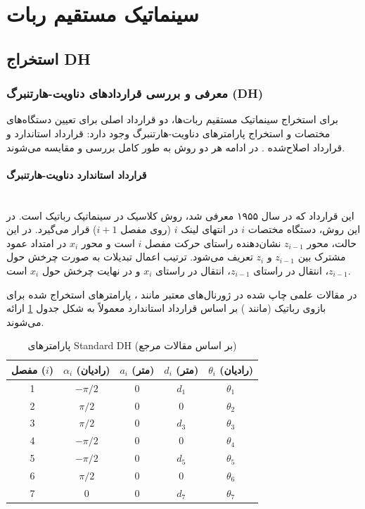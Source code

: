 \documentclass{article}
\begin{document}


\tableofcontents \clearpage
\listoffigures \clearpage
\listoftables \clearpage
\lstlistoflistings \clearpage
\newpage

\section{سینماتیک مستقیم ربات }

\subsection{استخراج DH}

\subsubsection{معرفی و بررسی قراردادهای دناویت-هارتنبرگ (DH)}

برای استخراج سینماتیک مستقیم ربات‌ها، دو قرارداد اصلی برای تعیین دستگاه‌های مختصات و استخراج پارامترهای دناویت-هارتنبرگ وجود دارد: قرارداد استاندارد  و قرارداد اصلاح‌شده . در ادامه هر دو روش به طور کامل بررسی و مقایسه می‌شوند.

\paragraph{قرارداد استاندارد دناویت-هارتنبرگ }\mbox{}\\
این قرارداد که در سال ۱۹۵۵ معرفی شد، روش کلاسیک در سینماتیک رباتیک است. در این روش، دستگاه مختصات $i$ در انتهای لینک $i$ (روی مفصل $i+1$) قرار می‌گیرد. در این حالت، محور $z_{i-1}$ نشان‌دهنده راستای حرکت مفصل $i$ است و محور $x_i$ در امتداد عمود مشترک بین $z_{i-1}$ و $z_i$ تعریف می‌شود. ترتیب اعمال تبدیلات به صورت چرخش حول $z_{i-1}$، انتقال در راستای $z_{i-1}$، انتقال در راستای $x_i$ و در نهایت چرخش حول $x_i$ است. 

در مقالات علمی چاپ شده در ژورنال‌های معتبر مانند  ، پارامترهای استخراج شده برای بازوی رباتیک (مانند ) بر اساس قرارداد استاندارد معمولاً به شکل جدول \ref{tab:standard_dh} ارائه می‌شوند.

\begin{table}[htbp]
	\centering
	\caption{پارامترهای Standard DH (بر اساس مقالات مرجع)}
	\label{tab:standard_dh}
	\begin{tabular}{|c|c|c|c|c|}
		\hline
		مفصل ($i$) & $\alpha_i$ (رادیان) & $a_i$ (متر) & $d_i$ (متر) & $\theta_i$ (رادیان) \\ \hline
		1 & $-\pi/2$ & 0 & $d_1$ & $\theta_1$ \\ \hline
		2 & $\pi/2$ & 0 & 0 & $\theta_2$ \\ \hline
		3 & $\pi/2$ & 0 & $d_3$ & $\theta_3$ \\ \hline
		4 & $-\pi/2$ & 0 & 0 & $\theta_4$ \\ \hline
		5 & $-\pi/2$ & 0 & $d_5$ & $\theta_5$ \\ \hline
		6 & $\pi/2$ & 0 & 0 & $\theta_6$ \\ \hline
		7 & 0 & 0 & $d_7$ & $\theta_7$ \\ \hline
	\end{tabular}
\end{table}
\end{document}
